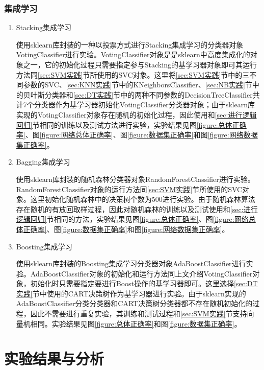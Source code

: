 \documentclass[a4paper]{ctexart}
\begin{document}
\subsubsection{集成学习}
\begin{enumerate}
	\item Stacking集成学习
	
	使用sklearn库封装的一种以投票方式进行Stacking集成学习的分类器对象VotingClassifier进行实验。VotingClassifier对象是是sklearn中高度集成化的对象之一，它的初始化过程只需要指定参与Stacking的基学习器对象即可其运行方法同\ref{sec:SVM实践}节所使用的SVC对象。这里将\ref{sec:SVM实践}节中的三不同参数的SVC、\ref{sec:KNN实践}节中的KNeighborsClassifier、\ref{sec:NB实践}节中的贝叶斯分类器和\ref{sec:DT实践}节中的两种不同参数的DecisionTreeClassifier共计7个分类器作为基学习器初始化VotingClassifier分类器对象；由于sklearn库实现的VotingClassifier对象存在随机的初始化过程，因此使用和\ref{sec:进行逻辑回归}节相同的训练以及测试方法进行实验，实验结果见图\ref{figure:总体正确率}、图\ref{figure:网络总体正确率}、图\ref{figure:数据集正确率}和图\ref{figure:网络数据集正确率}。

	\item Bagging集成学习
	
	使用sklearn库封装的随机森林分类器对象RandomForestClassifier进行实验。RandomForestClassifier对象的运行方法同\ref{sec:SVM实践}节所使用的SVC对象。这里初始化随机森林中的决策树个数为500进行实验。由于随机森林算法存在随机的有放回取样过程，因此对随机森林的训练以及测试使用和\ref{sec:进行逻辑回归}节相同的方法，实验结果见图\ref{figure:总体正确率}、图\ref{figure:网络总体正确率}、图\ref{figure:数据集正确率}和图\ref{figure:网络数据集正确率}。

	\item Boosting集成学习
	
	使用sklearn库封装的Boosting集成学习分类器对象AdaBoostClassifier进行实验。AdaBoostClassifier对象的初始化和运行方法同上文介绍VotingClassifier对象，初始化时只需要指定要进行Boost操作的基学习器即可。这里选择\ref{sec:DT实践}节中使用的CART决策树作为基学习器进行实验。由于sklearn实现的AdaBoostClassifier分类分类器和CART决策树分类器都不存在随机初始化的过程，因此不需要进行重复实验，其训练和测试过程和\ref{sec:SVM实践}节支持向量机相同。实验结果见图\ref{figure:总体正确率}和图\ref{figure:数据集正确率}。
	
\end{enumerate}

\section{实验结果与分析}
\end{document}

